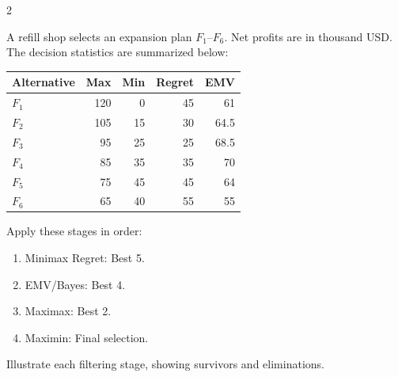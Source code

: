 \begin{multicols}{2}
		
		A refill shop selects an expansion plan $F_1$--$F_6$. Net profits are in thousand USD. The decision statistics are summarized below:
		\vspace{-3mm}
		\begin{center}\small\setlength{\tabcolsep}{4pt}
			\begin{tabular}{lrrrr}\toprule
				Alternative & Max & Min & Regret & EMV\\ \midrule
				$F_1$ & 120 & 0 & 45 & 61\\
				$F_2$ & 105 & 15 & 30 & 64.5\\
				$F_3$ & 95 & 25 & 25 & 68.5\\
				$F_4$ & 85 & 35 & 35 & 70\\
				$F_5$ & 75 & 45 & 45 & 64\\
				$F_6$ & 65 & 40 & 55 & 55\\
				\bottomrule
			\end{tabular}
		\end{center}
		\vspace{-3mm}
		Apply these stages in order:
		\begin{enumerate}[leftmargin=*]
			\item Minimax Regret: Best 5.
			\item EMV/Bayes: Best 4.
			\item Maximax: Best 2.
			\item Maximin: Final selection.
		\end{enumerate}
		Illustrate each filtering stage, showing survivors and eliminations.
		

\end{multicols}
